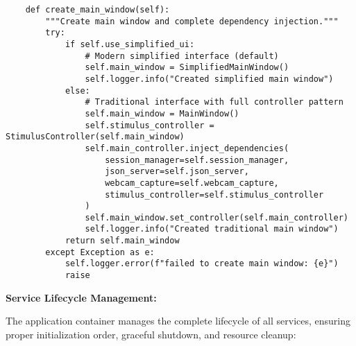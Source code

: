 \documentclass[11pt,a4paper]{article}
\begin{document}
\begin{verbatim}
    def create_main_window(self):
        """Create main window and complete dependency injection."""
        try:
            if self.use_simplified_ui:
                # Modern simplified interface (default)
                self.main_window = SimplifiedMainWindow()
                self.logger.info("Created simplified main window")
            else:
                # Traditional interface with full controller pattern
                self.main_window = MainWindow()
                self.stimulus_controller = StimulusController(self.main_window)
                self.main_controller.inject_dependencies(
                    session_manager=self.session_manager,
                    json_server=self.json_server,
                    webcam_capture=self.webcam_capture,
                    stimulus_controller=self.stimulus_controller
                )
                self.main_window.set_controller(self.main_controller)
                self.logger.info("Created traditional main window")
            return self.main_window
        except Exception as e:
            self.logger.error(f"failed to create main window: {e}")
            raise
\end{verbatim}

\textbf{Service Lifecycle Management:}

The application container manages the complete lifecycle of all services, ensuring proper initialization order, graceful
shutdown, and resource cleanup:
\end{document}
